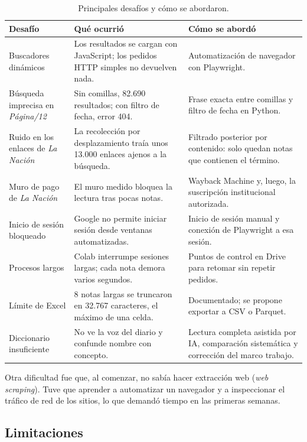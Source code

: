 \documentclass[11pt,a4paper]{article}
\newcommand{\pdoce}{\textit{Página/12}}
\newcommand{\lanac}{\textit{La Nación}}
\begin{document}
\begin{table}[h]
\centering\small
\caption{Principales desafíos y cómo se abordaron.}
\label{tab:desafios}
\begin{tabularx}{\linewidth}{>{\raggedright}p{3.3cm} >{\raggedright}X >{\raggedright\arraybackslash}X}
\toprule
\textbf{Desafío} & \textbf{Qué ocurrió} & \textbf{Cómo se abordó} \\
\midrule
Buscadores dinámicos & Los resultados se cargan con JavaScript; los pedidos HTTP simples no devuelven nada. & Automatización de navegador con Playwright. \\
Búsqueda imprecisa en \pdoce & Sin comillas, 82.690 resultados; con filtro de fecha, error 404. & Frase exacta entre comillas y filtro de fecha en Python. \\
Ruido en los enlaces de \lanac & La recolección por desplazamiento traía unos 13.000 enlaces ajenos a la búsqueda. & Filtrado posterior por contenido: solo quedan notas que contienen el término. \\
Muro de pago de \lanac & El muro medido bloquea la lectura tras pocas notas. & Wayback Machine y, luego, la suscripción institucional autorizada. \\
Inicio de sesión bloqueado & Google no permite iniciar sesión desde ventanas automatizadas. & Inicio de sesión manual y conexión de Playwright a esa sesión. \\
Procesos largos & Colab interrumpe sesiones largas; cada nota demora varios segundos. & Puntos de control en Drive para retomar sin repetir pedidos. \\
Límite de Excel & 8 notas largas se truncaron en 32.767 caracteres, el máximo de una celda. & Documentado; se propone exportar a CSV o Parquet. \\
Diccionario insuficiente & No ve la voz del diario y confunde nombre con concepto. & Lectura completa asistida por IA, comparación sistemática y corrección del marco trabajo. \\
\bottomrule
\end{tabularx}
\end{table}

Otra dificultad fue que, al comenzar, no sabía hacer extracción web (\textit{web scraping}). Tuve que aprender a automatizar un navegador y a inspeccionar el tráfico de red de los sitios, lo que demandó tiempo en las primeras semanas.

\subsection{Limitaciones}
\label{sec:limitaciones}
\end{document}
